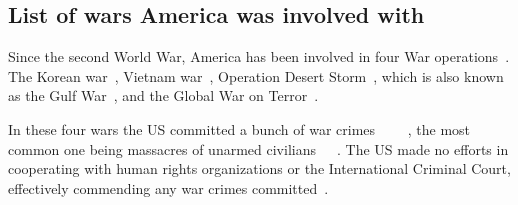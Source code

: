 \subsection{List of wars America was involved with}
Since the second World War, America has been involved in four War operations~\cite{va-gov-american-wars}.
The Korean war~\cite{va-gov-american-wars}, Vietnam war~\cite{va-gov-american-wars}, Operation Desert Storm~\cite{va-gov-american-wars}, which is also known as the Gulf War~\cite{defense-gov-gulf}, and the Global War on Terror~\cite{va-gov-american-wars}.

In these four wars the US committed a bunch of war crimes ~\cite{globalpolicy-iraq-warcrimes}~\cite{historynews-vietnam-warcrimes}~\cite{hrw-hr-abuses-afghanistan}~\cite{washingtonpost-korea-warcrimes}, the most common one being massacres of unarmed civilians~\cite{asiasociety-nogun-ri}~\cite{history-my-lai}~\cite{theguardian-shinwar-shooting}. The US made no efforts in cooperating with human rights organizations or the International Criminal Court, effectively commending any war crimes committed~\cite{globaltimes-us-evade-warcrimes}.